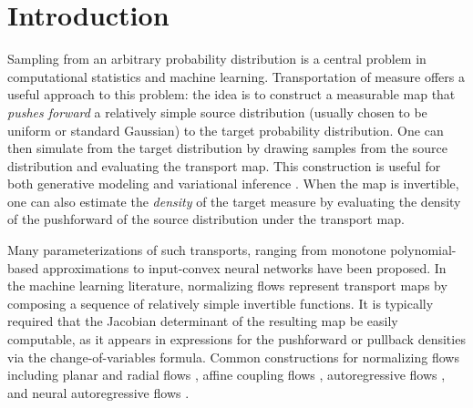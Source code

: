 \section{Introduction}\label{sec:intro}

Sampling from an arbitrary probability distribution is a central problem in computational statistics and machine learning. Transportation of measure \citep{OptimalOldAndNew} offers a useful approach to this problem: the idea is to construct a measurable map that \emph{pushes forward} a relatively simple source distribution (usually chosen to be uniform or standard Gaussian) to the target probability distribution. One can then simulate from the target distribution by drawing samples from the source distribution and evaluating the transport map. This construction is useful for both generative modeling \citep{ffjord,glow} and variational inference \citep{moselhy2012,PlanarFlow}. When the map is invertible, one can also estimate the \emph{density} of the target measure by evaluating the density of the pushforward of the source distribution under the transport map.


Many parameterizations of such transports, ranging from monotone polynomial-based approximations %
\citep{measure-transport,ZM1,ZM2,baptista23}
to input-convex neural networks \citep{huang2021convex,2310.16975} have been proposed. In the machine learning literature, normalizing flows \citep{cms/1266935020,NormalizingFlowIntro} represent transport maps by composing a sequence of relatively simple invertible functions. It is typically required that the Jacobian determinant of the resulting map be easily computable, as it appears in expressions for the pushforward or pullback densities via the change-of-variables formula. Common constructions for normalizing flows including planar and radial flows \citep{PlanarFlow}, affine coupling flows \citep{CouplingFlows}, autoregressive flows \citep{autoregressiveflow}, and neural autoregressive flows \citep{NeuralAutoFlow}.

